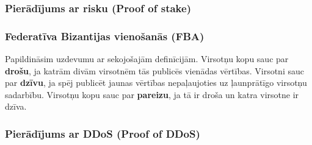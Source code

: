\subsubsection{Pierādījums ar risku (Proof of stake)}
\subsubsection{Federatīva Bizantijas vienošanās (FBA)}
Papildināsim uzdevumu ar sekojošajām definīcijām.
Virsotņu kopu sauc par \textbf{drošu}, ja katrām divām virsotnēm tās publicēs vienādas vērtības.
Virsotni sauc par \textbf{dzīvu}, ja spēj publicēt jaunas vērtības nepaļaujoties uz ļaunprātīgo virsotņu sadarbību.
Virsotņu kopu sauc par \textbf{pareizu}, ja tā ir droša un katra virsotne ir dzīva.
\subsubsection{Pierādījums ar DDoS (Proof of DDoS)}






